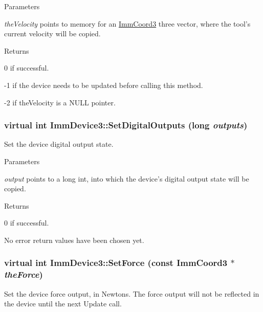 \begin{DoxyParams}{Parameters}
\item[{\em theVelocity}]points to memory for an \hyperlink{structImmCoord3}{ImmCoord3} three vector, where the tool's current velocity will be copied.\end{DoxyParams}
\begin{DoxyReturn}{Returns}

\end{DoxyReturn}
0 if successful.

-\/1 if the device needs to be updated before calling this method.

-\/2 if theVelocity is a NULL pointer. \hypertarget{classImmDevice3_ac575b58d33998f0692b89429ada48c98}{
\subsubsection[{SetDigitalOutputs}]{\setlength{\rightskip}{0pt plus 5cm}virtual int ImmDevice3::SetDigitalOutputs (long {\em outputs})}}
\label{classImmDevice3_ac575b58d33998f0692b89429ada48c98}
Set the device digital output state.


\begin{DoxyParams}{Parameters}
\item[{\em output}]points to a long int, into which the device's digital output state will be copied.\end{DoxyParams}
\begin{DoxyReturn}{Returns}

\end{DoxyReturn}
0 if successful.

No error return values have been chosen yet. \hypertarget{classImmDevice3_abac0c7165de45fd8336f5bf9ec617e7e}{
\subsubsection[{SetForce}]{\setlength{\rightskip}{0pt plus 5cm}virtual int ImmDevice3::SetForce (const {\bf ImmCoord3} $\ast$ {\em theForce})}}
\label{classImmDevice3_abac0c7165de45fd8336f5bf9ec617e7e}
Set the device force output, in Newtons. The force output will not be reflected in the device until the next Update call.


